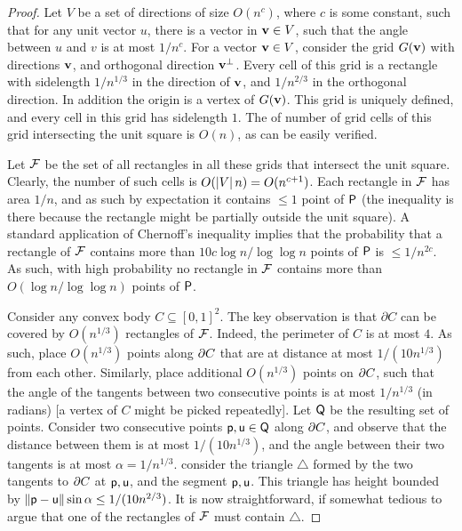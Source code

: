 \begin{proof}
    Let $V$ be a set of directions of size $O(n^{c})$, where $c$ is
    some constant, such that for any unit vector $u$, there is a
    vector in $\mathbf{v} \in V$, such that the angle between $u$ and $v$
    is at most $1/n^{c}$. For a vector $\mathbf{v} \in V$, consider the
    grid $G(\mathbf{v})$ with directions $\mathbf{v}$, and orthogonal direction
    $\mathbf{v}^\perp$. Every cell of this grid is a rectangle with
    sidelength $1/n^{1/3}$ in the direction of $\mathbf{v}$, and
    $1/n^{2/3}$ in the orthogonal direction. In addition the origin is
    a vertex of $G(\mathbf{v})$. This grid is uniquely defined, and every
    cell in this grid has sidelength $1$. The of number of grid cells
    of this grid intersecting the unit square is $O(n)$, as can be
    easily verified.

    Let $\mathcal{F}$ be the set of all rectangles in all these grids that
    intersect the unit square. Clearly, the number of such cells is
    $O(\left| {V} \right| n) = O(n^{c+1})$. Each rectangle in $\mathcal{F}$ has
    area $1/n$, and as such by expectation it contains $\leq 1$ point
    of ${\mathsf{P}}$ (the inequality is there because the rectangle might
    be partially outside the unit square). A standard application of
    Chernoff's inequality implies that the probability that a
    rectangle of $\mathcal{F}$ contains more than
    $10 c \log n/ \log \log n$ points of ${\mathsf{P}}$ is $\leq
    1/n^{2c}$. As such, with high probability no rectangle in
    $\mathcal{F}$ contains more than $O( \log n/ \log \log n)$ points of
    ${\mathsf{P}}$.

    Consider any convex body $C \subseteq [0,1]^2$. The key
    observation is that $\partial{C}$ can be covered by $O(n^{1/3})$
    rectangles of $\mathcal{F}$. Indeed, the perimeter of $C$ is at most
    $4$. As such, place $O(n^{1/3})$ points along ${\partial} C$ that are at
    distance at most $1/(10n^{1/3})$ from each other. Similarly, place
    additional $O(n^{1/3})$ points on ${\partial}{C}$, such that the angle of
    the tangents between two consecutive points is at most $1/n^{1/3}$
    (in radians) [a vertex of $C$ might be picked repeatedly]. Let
    ${\mathsf{Q}}$ be the resulting set of points.  Consider two
    consecutive points $\mathsf{p},\mathsf{u} \in {\mathsf{Q}}$ along ${\partial} C$, and
    observe that the distance between them is at most $1/(10n^{1/3})$,
    and the angle between their two tangents is at most
    $\alpha = 1/n^{1/3}$.  consider the triangle $\triangle$ formed by
    the two tangents to ${\partial} C$ at $\mathsf{p}, \mathsf{u}$, and the segment
    $\mathsf{p}, \mathsf{u}$. This triangle has height bounded by
    $\left\| {\mathsf{p} - \mathsf{u}} \right\| \sin \alpha \leq 1/(10n^{2/3})$. It is now
    straightforward, if somewhat tedious to argue that one of the
    rectangles of $\mathcal{F}$ must contain $\triangle$.


\end{proof}
